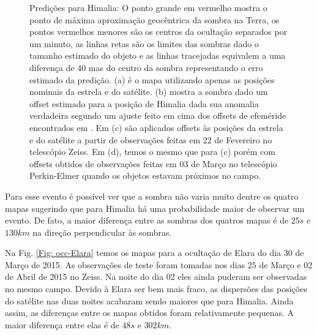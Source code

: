 \documentclass[12pt,a4paper]{monografia}
\begin{document}
\begin{figure}[h!]
\begin{centering}
\caption{Predições para Himalia: O ponto grande em vermelho mostra o ponto de máxima aproximação geocêntrica da sombra na Terra, os pontos vermelhos menores são os centros da ocultação separados por um minuto, as linhas retas são os limites das sombras dado o tamanho estimado do objeto e as linhas tracejadas equivalem a uma diferença de 40 mas do centro da sombra representando o erro estimado da predição. (a) é o mapa utilizando apenas as posições nominais da estrela e do satélite. (b) mostra a sombra dado um offset estimado para a posição de Himalia dada sua anomalia verdadeira segundo um ajuste feito em cima dos offsets de efeméride encontrados em \cite{GomesJunior2015-Irregular}. Em (c) são aplicados offsets às posições da estrela e do satélite a partir de observações feitas em 22 de Fevereiro no telescópio Zeiss. Em (d), temos o mesmo que para (c) porém com offsets obtidos de observações feitas em 03 de Março no telescópio Perkin-Elmer quando os objetos estavam próximos no campo.}
\label{Fig: occ-Himalia}
\end{centering}
\end{figure}

Para esse evento é possível ver que a sombra não varia muito dentre os quatro mapas sugerindo que para Himalia há uma probabilidade maior de observar um evento. De fato, a maior diferença entre as sombras dos quatros mapas é de $25 s$ e $130 km$ na direção perpendicular às sombras.

Na Fig. \ref{Fig: occ-Elara} temos os mapas para a ocultação de Elara do dia 30 de Março de 2015. As observações de teste foram tomadas nos dias 25 de Março e 02 de Abril de 2015 no Zeiss. Na noite do dia 02 eles ainda puderam ser observadas no mesmo campo. Devido à Elara ser bem mais fraco, as dispersões das posições do satélite nas duas noites acabaram sendo maiores que para Himalia. Ainda assim, as diferenças entre os mapas obtidos foram relativamente pequenas. A maior diferença entre elas é de $48 s$ e $302 km$.
\end{document}
